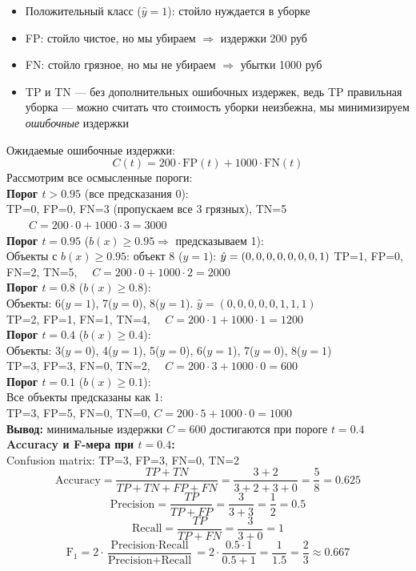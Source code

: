 \documentclass[12pt,a4paper]{article}
\begin{document}
\begin{itemize}
    \item Положительный класс ($\hat{y}=1$): стойло нуждается в уборке
    \item FP: стойло чистое, но мы убираем $\Rightarrow$
    издержки 200 руб
    \item FN: стойло грязное, но мы не убираем $\Rightarrow$
    убытки 1000 руб
    \item TP и TN --- без дополнительных ошибочных издержек, ведь TP правильная уборка --- можно считать что стоимость уборки
    неизбежна, мы минимизируем \emph{ошибочные} издержки
\end{itemize}
Ожидаемые ошибочные издержки:
\[
C(t) = 200 \cdot \text{FP}(t) + 1000 \cdot \text{FN}(t)
\]
Рассмотрим все осмысленные пороги:\\[1mm]
\textbf{Порог $t > 0.95$} (все предсказания 0):\\[1mm]
TP=0, FP=0, FN=3 (пропускаем все 3 грязных), TN=5 $\qquad C = 200\cdot 0 + 1000\cdot 3 = 3000$\\[1mm]
\textbf{Порог $t = 0.95$} ($b(x)\ge 0.95 \Rightarrow$ предсказываем 1):\\[1mm]
Объекты с $b(x)\ge 0.95$: объект 8 ($y=1$): $\hat{y}=(0,0,0,0,0,0,0,1) \\[1mm]
$ TP=1, FP=0, FN=2, TN=5, $\quad C = 200\cdot 0 + 1000\cdot 2 = 2000$\\[1mm]
\textbf{Порог $t = 0.8$} ($b(x)\ge 0.8$):\\[1mm]
Объекты: 6($y=1$), 7($y=0$), 8($y=1$). $\hat{y}=(0,0,0,0,0,1,1,1)$\\[1mm]
TP=2, FP=1, FN=1, TN=4, $\quad C = 200\cdot 1 + 1000\cdot 1 = 1200$\\[1mm]
\textbf{Порог $t = 0.4$} ($b(x)\ge 0.4$):\\[1mm]
Объекты: 3($y=0$), 4($y=1$), 5($y=0$), 6($y=1$), 7($y=0$), 8($y=1$)\\[1mm]
TP=3, FP=3, FN=0, TN=2, $\quad C = 200\cdot 3 + 1000\cdot 0 = 600$\\[1mm]
\textbf{Порог $t = 0.1$} ($b(x)\ge 0.1$):\\[1mm]
Все объекты предсказаны как 1:\\[1mm]
TP=3, FP=5, FN=0, TN=0, $ C = 200\cdot 5 + 1000\cdot 0 = 1000$\\[1mm]
\textbf{Вывод:} минимальные издержки $C = 600$ достигаются при пороге
$t = 0.4$\\[1mm]
\textbf{ Accuracy и F-мера при $t = 0.4$:}\\[1mm]
Confusion matrix: TP=3, FP=3, FN=0, TN=2
\[
\text{Accuracy} = \frac{TP+TN}{TP+TN+FP+FN} = \frac{3+2}{3+2+3+0}
= \frac{5}{8} = 0.625
\]
\[
\text{Precision} = \frac{TP}{TP+FP} = \frac{3}{3+3} = \frac{1}{2} = 0.5
\]
\[
\text{Recall} = \frac{TP}{TP+FN} = \frac{3}{3+0} = 1
\]
\[
\text{F}_1 = 2\cdot\frac{\text{Precision}\cdot\text{Recall}}
{\text{Precision}+\text{Recall}}
= 2\cdot\frac{0.5\cdot 1}{0.5 + 1} = \frac{1}{1.5}
= \frac{2}{3} \approx 0.667
\]
\end{document}
